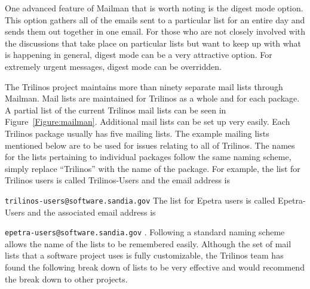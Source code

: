 \documentclass[12pt,relax]{article}
\newcommand{\InlineCommand}[1]{
  {\hspace{0.01 in}} {\tt #1} {\hspace{0.01 in}}}
\begin{document}
One advanced feature of Mailman that is worth noting is the digest mode option.
This option gathers all of the emails sent to a particular list for an entire 
day and sends them out together in one email.  For those who are not closely 
involved with the discussions that take place on particular lists but want to 
keep up with what is happening in general, digest mode can be a very 
attractive option.  For extremely urgent messages, digest mode can 
be overridden.

The Trilinos project maintains more than ninety separate mail lists through 
Mailman.  Mail lists are maintained for Trilinos as a whole and for each 
package.  A partial list of the current Trilinos mail lists can be seen in 
Figure~\ref{Figure:mailman}.  
Additional mail lists can be set up very easily.  Each Trilinos 
package usually has five mailing lists.  The example mailing lists mentioned 
below are to be used for issues relating to all of Trilinos.  
The names for the lists pertaining to individual packages follow the same 
naming scheme, simply replace ``Trilinos'' with the name of the package.  For example, the list for Trilinos users is 
called Trilinos-Users and the email address is 
\InlineCommand{trilinos-users@software.sandia.gov}  The list 
for Epetra users is called Epetra-Users and the associated email address is 
\InlineCommand{epetra-users@software.sandia.gov}.  Following a standard naming
scheme allows the name of the lists to be remembered easily.  Although the 
set of mail lists that a software project uses is fully customizable, the 
Trilinos team has found the following break down of lists to be very effective 
and would recommend the break down to other projects.
\end{document}
